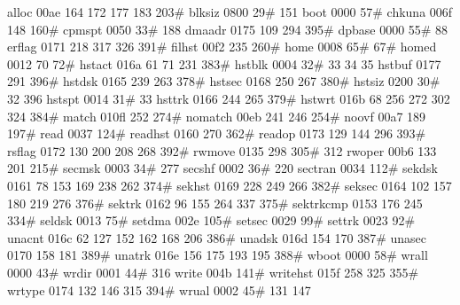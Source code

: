 alloc          00ae    164    172    177    183    203#
blksiz         0800     29#   151
boot           0000     57#
chkuna         006f    148    160#
cpmspt         0050     33#   188
dmaadr         0175    109    294    395#
dpbase         0000     55#    88
erflag         0171    218    317    326    391#
filhst         00f2    235    260#
home           0008     65#    67#
homed          0012     70     72#
hstact         016a     61     71    231    383#
hstblk         0004     32#    33     34     35
hstbuf         0177    291    396#
hstdsk         0165    239    263    378#
hstsec         0168    250    267    380#
hstsiz         0200     30#    32    396
hstspt         0014     31#    33
hsttrk         0166    244    265    379#
hstwrt         016b     68    256    272    302    324    384#
match          010fl   252    274#
nomatch        00eb    241    246    254#
noovf          00a7    189    197#
read           0037    124#
readhst        0160    270    362#
readop         0173    129    144    296    393#
rsflag         0172    130    200    208    268    392#
rwmove         0135    298    305#   312
rwoper         00b6    133    201    215#
secmsk         0003     34#   277
secshf         0002     36#   220
sectran        0034    112#
sekdsk         0161     78    153    169    238    262    374#
sekhst         0169    228    249    266    382#
seksec         0164    102    157    180    219    276    376#
sektrk         0162     96    155    264    337    375#
sektrkcmp      0153    176    245    334#
seldsk         0013     75#
setdma         002e    105#
setsec         0029     99#
settrk         0023     92#
unacnt         016c     62    127    152    162    168    206    386#
unadsk         016d    154    170    387#
unasec         0170    158    181    389#
unatrk         016e    156    175    193    195    388#
wboot          0000     58#
wrall          0000     43#
wrdir          0001     44#   316
write          004b    141#
writehst       015f    258    325    355#
wrtype         0174    132    146    315    394#
wrual          0002     45#   131    147
